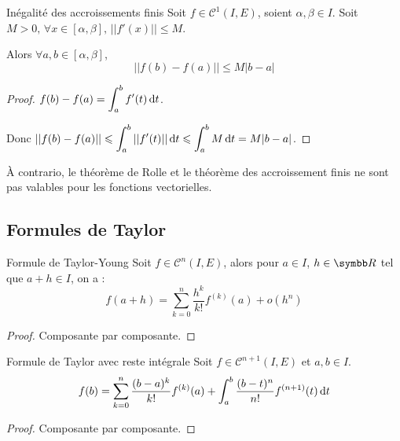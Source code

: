 \begin{theoreme}{Inégalité des accroissements finis}{}
    Soit $f \in \mathscr C^1(I, E)$, soient $\alpha,\beta \in I$. Soit $M > 0, \, \forall x \in [\alpha,\beta], \, ||f'(x)|| \leqslant M$.

    Alors $\forall a, b \in [\alpha,\beta]$, 
    \[||f(b) - f(a)|| \leqslant M |b - a|\]
\end{theoreme}


\begin{proof}
    $\displaystyle f(b) - f(a) = \int_a^b f'(t) \,\mathrm{d}t$.

    Donc $\displaystyle ||f(b) - f(a)|| \leqslant \int_a^b ||f'(t)|| \,\mathrm{d}t \leqslant \int_a^b M \,\mathrm{d}t = M |b - a|$.
\end{proof}

\begin{remarque}
    À contrario, le théorème de Rolle et le théorème des accroissement finis ne sont pas valables pour les fonctions vectorielles.
\end{remarque}

\subsection{Formules de Taylor}


\begin{proposition}{Formule de Taylor-Young}{}
    Soit $f \in \mathscr C^n(I, E)$, alors pour $a \in I$, $h \in \R$ tel que $a + h \in I$, on a :
    \[f(a + h) = \sum_{k = 0 }^{n } \frac{h^k}{k!} f^{(k)}(a) + o(h^n)\]
\end{proposition}

\begin{proof}
    Composante par composante.
\end{proof}

\begin{proposition}{Formule de Taylor avec reste intégrale}{}
    Soit $f \in \mathscr C^{n + 1}(I, E)$ et $a, b \in I$. 
    \[f(b) = \sum_{k = 0 }^{n } \frac{(b - a)^k}{k!} f^{(k)}(a) + \int_a^b \frac{(b - t)^n}{n!} f^{(n+1)}(t) \,\mathrm{d}t\]
\end{proposition}

\begin{proof}
    Composante par composante.
\end{proof}

